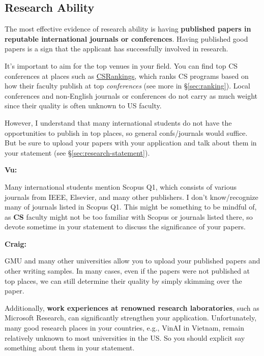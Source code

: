 \documentclass[11pt]{article}
\newenvironment{commentbox}[1][]{
\small
    \begin{mybox}
    {\small \textbf{#1}}
 }{
   \end{mybox}
}
\begin{document}
\subsection{Research Ability}

The most effective evidence of research ability is having \textbf{published papers in reputable international journals or conferences}.
Having published good papers is a sign that the applicant has successfully involved in research.

It's important to aim for the top venues in your field. You can
find top CS conferences at places such as \href{https://csrankings.org}{CSRankings}, which ranks CS programs based on how their faculty publish at top \emph{conferences} (see more in \S\ref{sec:ranking}). Local conferences and non-English journals or conferences do
not carry as much weight since their quality is often unknown to US faculty.


However, I understand that many international students do not have the opportunities to publish in top places, so general confs/journals would suffice.  But be sure to upload your papers with your application and talk about them in your statement (see \S\ref{sec:research-statement}).

\begin{commentbox}[Vu:]
Many international students mention Scopus Q1, which consists of various journals from IEEE, Elsevier, and many other publishers.  I don't know/recognize many of journals listed in Scopus Q1. This might be something to be mindful of, as \textbf{CS} faculty might not be too familiar with Scopus or journals listed there, so devote sometime in your statement to discuss the significance of your papers.
\end{commentbox}

\begin{commentbox}[Craig:]
GMU and many other universities allow you to upload your published papers and other writing samples. In many cases, even if the papers were not published at top places, we can still determine their quality by simply skimming over the paper.  
\end{commentbox}

Additionally, \textbf{work experiences at renowned research laboratories}, such as Microsoft Research, can significantly strengthen your
application.  Unfortunately, many good research places in your countries, e.g., VinAI in Vietnam, remain relatively unknown to most universities in the US. So you should explicit say something about them in your statement.
\end{document}
